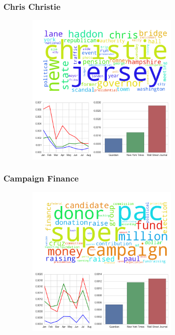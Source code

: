 \documentclass[11pt]{beamer}
\begin{document}
\begin{frame}
\frametitle{Chris Christie}

\begin{figure}
\centering
\includegraphics[width=85mm,height=75mm]{figures/source_topic1.png}
\end{figure} 

\end{frame}


\begin{frame}
\frametitle{Campaign Finance}

\begin{figure}
\centering
\includegraphics[width=85mm,height=75mm]{figures/source_topic2.png}
\end{figure} 

\end{frame}

\end{document}
